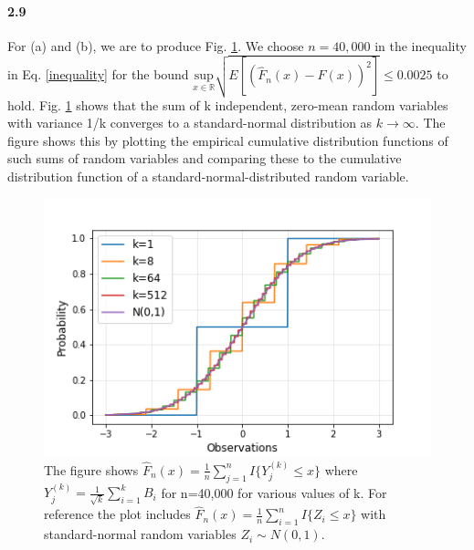 \documentclass{article}
\begin{document}
\paragraph{2.9}
For (a) and (b), we are to produce Fig. \ref{fig:plot9}. We choose $n=40,000$ in the inequality in Eq. \ref{inequality} for the bound $\underset{x \in \mathds{R}}{\text{sup}} \sqrt{E[(\hat{F}_n(x)-F(x))^2]} \le 0.0025$ to hold. Fig. \ref{fig:plot9} shows that the sum of k independent, zero-mean random variables with variance 1/k converges to a standard-normal distribution as $k\longrightarrow\infty$. The figure shows this by plotting the empirical cumulative distribution functions of such sums of random variables and comparing these to the cumulative distribution function of a standard-normal-distributed random variable.

\begin{figure}[h]
  \includegraphics[width=0.75\linewidth]{plot_hw0p9.png}
  \caption{The figure shows $\hat{F}_n(x)=\frac{1}{n} \sum_{j=1}^{n} I\{Y^{(k)}_j\le x\}$ where $Y^{(k)}_j=\frac{1}{\sqrt{k}}\sum_{i=1}^{k}{B_i}$ for n=40,000 for various values of k. For reference the plot includes $\hat{F}_n(x)=\frac{1}{n} \sum_{i=1}^{n} I\{Z_i\le x\}$ with standard-normal random variables $Z_i \sim N(0,1)$.}
  \label{fig:plot9}
\end{figure}
\end{document}
